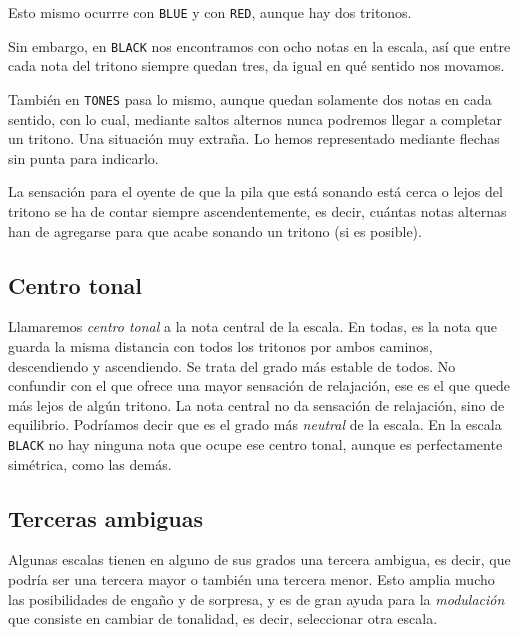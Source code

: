 \documentclass[]{article}
\begin{document}
Esto mismo ocurrre con \texttt{BLUE} y con \texttt{RED}, aunque hay dos tritonos.

Sin embargo, en \texttt{BLACK} nos encontramos con ocho notas en la escala, así que entre cada nota del tritono siempre quedan tres, da igual en qué sentido nos movamos.

También en \texttt{TONES} pasa lo mismo, aunque quedan solamente dos notas en cada sentido, con lo cual, mediante saltos alternos nunca podremos llegar a completar un tritono. Una situación muy extraña. Lo hemos representado mediante flechas sin punta para indicarlo.

La sensación para el oyente de que la pila que está sonando está cerca o lejos del tritono se ha de contar siempre ascendentemente, es decir, cuántas notas alternas han de agregarse para que acabe sonando un tritono (si es posible).

\subsection{Centro tonal}

Llamaremos \emph{centro tonal} a la nota central de la escala. En todas, es la nota que guarda la misma distancia con todos los tritonos por ambos caminos, descendiendo y ascendiendo. Se trata del grado más estable de todos. No confundir con el que ofrece una mayor sensación de relajación, ese es el que quede más lejos de algún tritono. La nota central no da sensación de relajación, sino de equilibrio. Podríamos decir que es el grado más \emph{neutral} de la escala. En la escala \texttt{BLACK} no hay ninguna nota que ocupe ese centro tonal, aunque es perfectamente simétrica, como las demás.

\subsection{Terceras ambiguas}

Algunas escalas tienen en alguno de sus grados una tercera ambigua, es decir, que podría ser una tercera mayor o también una tercera menor. Esto amplia mucho las posibilidades de engaño y de sorpresa, y es de gran ayuda para la \emph{modulación} que consiste en cambiar de tonalidad, es decir, seleccionar otra escala.
\end{document}
